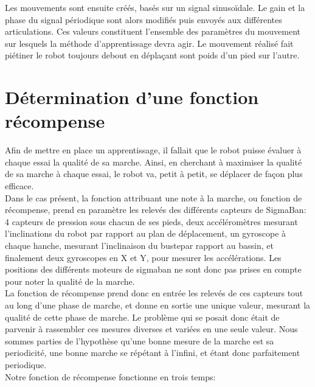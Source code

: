 \documentclass[11pt]{article}
\begin{document}
Les mouvements sont ensuite créés, basés sur un signal sinusoïdale. Le gain et la phase du signal périodique 
sont alors modifiés puis envoyés aux différentes articulations. Ces valeurs constituent l'ensemble des paramètres
du mouvement sur lesquels la méthode d'apprentissage devra agir. Le mouvement réalisé fait piétiner le robot 
toujours debout en déplaçant sont poids d'un pied sur l'autre.

\section{Détermination d'une fonction récompense}
Afin de mettre en place un apprentissage, il fallait que le robot puisse évaluer à chaque essai la qualité de sa marche. Ainsi, en cherchant à maximiser la qualité de sa marche à chaque essai, le robot va, petit à petit, se déplacer de façon plus efficace.\\
Dans le cas présent, la fonction attribuant une note à la marche, ou fonction de récompense, prend en paramètre les relevés des différents capteurs de SigmaBan: 4 capteurs de pression sous chacun de ses pieds, deux accéléromètres mesurant l'inclinations du robot par rapport au plan de déplacement, un gyroscope à chaque hanche, mesurant l'inclinaison du bustepar rapport au bassin, et finalement deux gyroscopes en X et Y, pour mesurer les accélérations. Les positions des différents moteurs de sigmaban ne sont donc pas prises en compte pour noter la qualité de la marche.\\
La fonction de récompense prend donc en entrée les relevés de ces capteurs tout au long d'une phase de marche, et donne en sortie une unique valeur, mesurant la qualité de cette phase de marche. Le problème qui se posait donc était de parvenir à rassembler ces mesures diverses et variées en une seule valeur. Nous sommes parties de l'hypothèse qu'une bonne mesure de la marche est sa periodicité, une bonne marche se répétant à l'infini, et étant donc parfaitement periodique.\\
Notre fonction de récompense fonctionne en trois temps:
\end{document}
